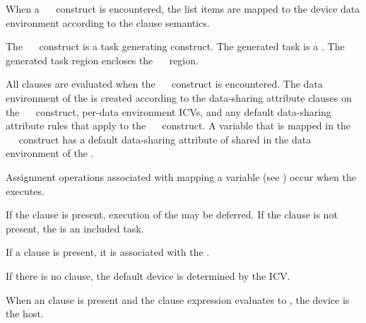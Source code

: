 \descr
When a ~~ construct is encountered, the list items are mapped to the device data environment according to the  clause semantics.

The ~~ construct is a task generating construct.  The generated task is a .  The generated task region encloses the ~~ region.

All clauses are evaluated when the ~~ construct is encountered.  The data environment of the  is created according to the data-sharing attribute clauses on the ~~ construct, per-data environment ICVs, and any default data-sharing attribute rules that apply to the ~~ construct.  A variable that is mapped in the ~~ construct has a default data-sharing attribute of shared in the data environment of the .

Assignment operations associated with mapping a variable (see ) occur when the  executes.

If the  clause is present, execution of the  may be deferred.  If the  clause is not present, the  is an included task.

If a  clause is present, it is associated with the .

If there is no  clause, the default device is determined by the  ICV.

When an  clause is present and the  clause expression evaluates to , the device is the host.


